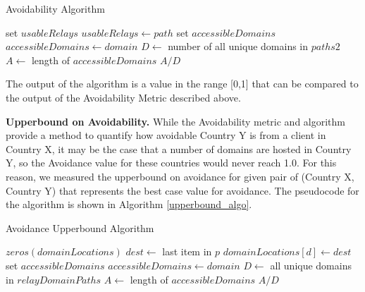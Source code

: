 \begin{algorithm}
\caption{Avoidability Algorithm}
\label{avoid_algo}
\begin{algorithmic}[1]
    \State set $usableRelays$
		\State $usableRelays \gets path$
	\EndIf
    \EndFor
    \State set $accessibleDomains$
        \State $accessibleDomains \gets domain$
        \EndIf
    \EndIf
    \EndFor
    \State $D \gets$ number of all unique domains in $paths2$
    \State $A \gets$ length of $accessibleDomains$
    \State \Return $A / D$
\EndFunction
\end{algorithmic}
\end{algorithm}

The output of the algorithm is a value in the range [0,1] that can be compared to the output of the Avoidability Metric described above.  

{\bf Upperbound on Avoidability.}  While the Avoidability metric and algorithm provide a method to quantify how avoidable Country Y is from a client in Country X, it may be the case that a number of domains are hosted in Country Y, so the Avoidance value for these countries would never reach 1.0.  For this reason, we measured the upperbound on avoidance for given pair of (Country X, Country Y) that represents the best case value for avoidance.  The pseudocode for the algorithm is shown in Algorithm \ref{upperbound_algo}.

\begin{algorithm}
\caption{Avoidance Upperbound Algorithm}
\label{upperbound_algo}
\begin{algorithmic}[1]
    \State $zeros(domainLocations)$
		\State $dest \gets $ last item in $p$
		\State $domainLocations[d] \gets dest$
    \EndFor
    \State set $accessibleDomains$
    \State $accessibleDomains \gets domain$
    \EndIf
    \EndFor
    \State $D \gets$ all unique domains in  $relayDomainPaths$
    \State $A \gets$ length of $accessibleDomains$
    \State \Return $A / D$
\EndFunction
\end{algorithmic}
\end{algorithm}

